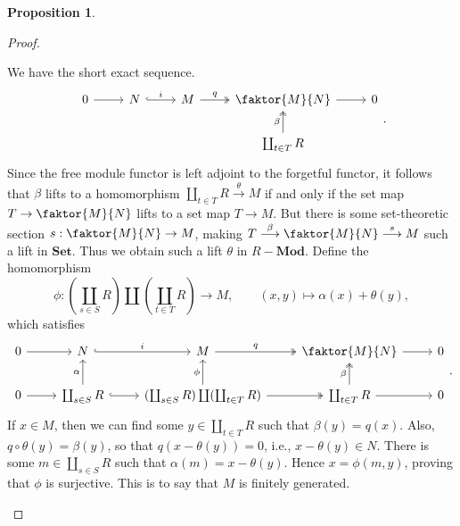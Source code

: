 \documentclass[10pt,letterpaper,cm]{nupset}
\theoremstyle{definition}
\newtheorem{prop}{Proposition}
\newcommand{\1}{\mathbf{1}}
\newcommand{\0}{\vec 0}
\begin{document}
\begin{prop}
\begin{enumerate}
\begin{proof}
\begin{enumerate}
We have the short exact sequence.
\[\begin{tikzcd}
0 \arrow[r] & N \arrow[r, "i", hook] & M \arrow[r, "q", two heads] & \faktor{M}{N} \arrow[r] & 0 \\
 &  &  & \coprod_{t\in T}R \arrow[u, "\beta", two heads] & 
\end{tikzcd}
.\]
Since the free module functor is left adjoint to the forgetful functor, it follows that $\beta$ lifts to a homomorphism $ \coprod_{t\in T}R \overset{\theta}{\longrightarrow} M$  if and only if the set map $T \to \faktor{M}{N}$ lifts to a set map $T \to M$. But there is some set-theoretic section $s: \faktor{M}{N} \to M$, making $T \overset{\beta}{\longrightarrow} \faktor{M}{N} \overset{s}{\longrightarrow} M$ such a lift in $\mathbf{Set}$. Thus we obtain such a lift $\theta$ in $R{-}\mathbf{Mod}$. Define the homomorphism $$\phi : (\coprod_{s\in S} R) \coprod (\coprod_{t\in T} R)\to M, \quad \quad (x,y) \mapsto \alpha(x) + \theta(y),$$ which satisfies
\[
\begin{tikzcd}
0 \arrow[r] & N \arrow[r, "i", hook] & M \arrow[r, "q", two heads] & \faktor{M}{N} \arrow[r] & 0 \\
0 \arrow[r] & \coprod_{s\in S}R \arrow[u, "\alpha"] \arrow[r, hook] & (\coprod_{s\in S} R) \coprod (\coprod_{t\in T} R) \arrow[u, "\phi"] \arrow[r, two heads] & \coprod_{t\in T}R \arrow[u, "\beta", two heads] \arrow[r] & 0
\end{tikzcd}.
\] 
If $x\in M$, then we can find some $y\in \coprod_{t\in T}R$ such that $\beta(y) = q(x)$. Also, $q\circ \theta(y) = \beta(y)$, so that $q(x- \theta(y) ) = 0$, i.e., $x-\theta(y) \in N$. There is some $m\in \coprod_{s\in S}R$ such that $\alpha(m) = x-\theta(y)$. Hence $x= \phi(m,y)$, proving that $\phi$ is surjective. This is to say that $M$ is finitely generated.
\end{enumerate}
\end{proof}
\end{enumerate}
\end{prop}
\end{document}
